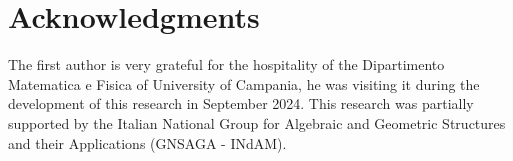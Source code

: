 \documentclass[11pt]{amsart}
\theoremstyle{definition}
\begin{document}
\section*{Acknowledgments}
The first author is very grateful for the hospitality of the Dipartimento Matematica e Fisica of University of Campania, he was visiting it during the development of this research in September 2024.
This research was partially supported by the Italian National Group for Algebraic and Geometric Structures and their Applications (GNSAGA - INdAM).



\end{document}

